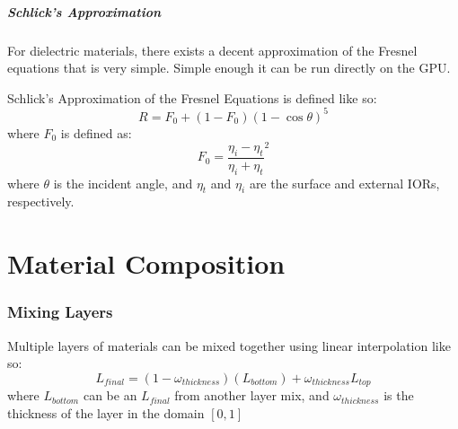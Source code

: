 \documentclass[12pt,letterpaper]{article}
\begin{document}
\subsubsection{Schlick's Approximation}
\label{sec:schlick}

For dielectric materials, there exists a decent approximation of the Fresnel equations that is very simple. 
Simple enough it can be run directly on the GPU.


Schlick's Approximation of the Fresnel Equations is defined like so:
$$
R = F_0 + \left(1 - F_0\right){\left(1 - \cos \theta\right)}^5
$$
where $F_0$ is defined as:
$$
F_0 = {\frac{\eta_i - \eta_t}{\eta_i + \eta_t}}^2
$$
where $\theta$ is the incident angle, and $\eta_t$ and $\eta_i$ are the surface and external IORs, respectively.


\newpage

\part{Material Composition}

\section{Mixing Layers}
\label{sec:mixing_layers}

Multiple layers of materials can be mixed together using linear interpolation like so:
$$
L_{final} = \left(1 - \omega_{thickness}\right)\left(L_{bottom}\right) + \omega_{thickness} L_{top}
$$
where $L_{bottom}$ can be an $L_{final}$ from another layer mix, 
and $\omega_{thickness}$ is the thickness of the layer in the domain $\left[0,1\right]$
\end{document}
